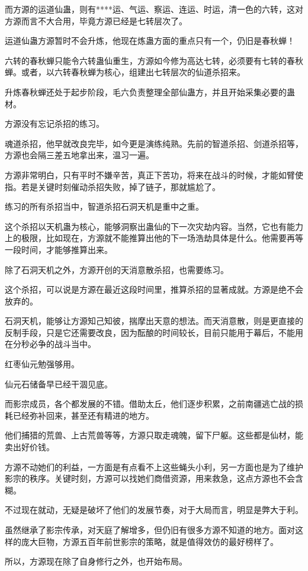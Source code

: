 \begin{this_body}
而方源的运道仙蛊，则有****运、气运、察运、连运、时运，清一色的六转，这对方源而言不大合用，毕竟方源已经是七转层次了。

运道仙蛊方源暂时不会升炼，他现在炼蛊方面的重点只有一个，仍旧是春秋蝉！

六转的春秋蝉只能令六转蛊仙重生，方源如今修为高达七转，必须要有七转的春秋蝉。或者，以六转春秋蝉为核心，组建出七转层次的仙道杀招来。

升炼春秋蝉还处于起步阶段，毛六负责整理全部仙蛊方，并且开始采集必要的蛊材。

方源没有忘记杀招的练习。

魂道杀招，他早就改良完毕，如今更是演练纯熟。先前的智道杀招、剑道杀招等，方源也会隔三差五地拿出来，温习一遍。

方源非常明白，只有平时不嫌辛苦，真正下苦功，将来在战斗的时候，才能如臂使指。若是关键时刻催动杀招失败，掉了链子，那就尴尬了。

练习的所有杀招当中，智道杀招石洞天机是重中之重。

这个杀招以天机蛊为核心，能够洞察出蛊仙的下一次灾劫内容。当然，它也有能力上的极限，比如现在，方源就不能推算出他的下一场浩劫具体是什么。他需要再等一段时间，才能够推算出来。

除了石洞天机之外，方源开创的天消意散杀招，也需要练习。

这个杀招，可以说是方源在最近这段时间里，推算杀招的显著成就。方源是绝不会放弃的。

石洞天机，能够让方源知己知彼，揣摩出天意的想法。而天消意散，则是更直接的反制手段，只是它还需要改良，因为酝酿的时间较长，目前只能用于幕后，不能用在分秒必争的战斗当中。

红枣仙元勉强够用。

仙元石储备早已经干涸见底。

而影宗成员，各个都发展的不错。借助太丘，他们逐步积累，之前南疆逃亡战的损耗已经弥补回来，甚至还有精进的地方。

他们捕猎的荒兽、上古荒兽等等，方源只取走魂魄，留下尸躯。这些都是仙材，能卖出好价钱。

方源不动她们的利益，一方面是有点看不上这些蝇头小利，另一方面也是为了维护影宗的秩序。关键时刻，方源可以找她们商借资源，用来救急，这点方源也不会含糊。

不过现在就动，无疑是破坏了他们的发展节奏，对于大局而言，明显是弊大于利。

虽然继承了影宗传承，对天庭了解增多，但仍旧有很多方源不知道的地方。面对这样的庞大巨物，方源五百年前世影宗的策略，就是值得效仿的最好榜样了。

所以，方源现在除了自身修行之外，也开始布局。


\end{this_body}
